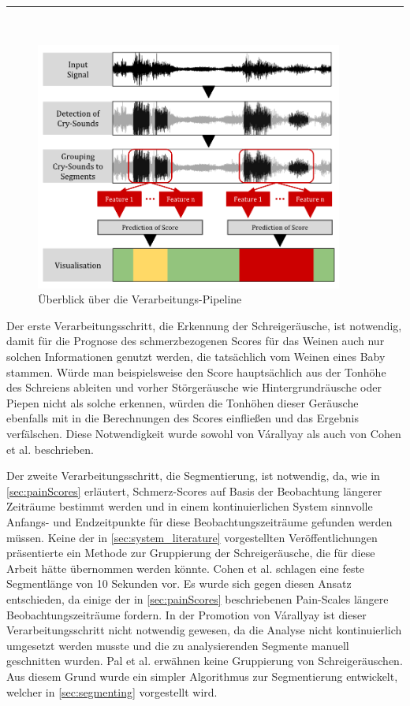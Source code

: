 \noindent\rule{\linewidth}{0.3pt} \\

\begin{figure}[h]
	\centering
	\includegraphics[width=0.9\textwidth]{bilder/konzept03.png}
	\caption{Überblick über die Verarbeitungs-Pipeline}
	\label{img:architecture-overview}
\end{figure}

Der erste Verarbeitungsschritt, die Erkennung der Schreigeräusche, ist notwendig, damit für die Prognose des schmerzbezogenen Scores für das Weinen auch nur solchen Informationen genutzt werden, die tatsächlich vom Weinen eines Baby stammen. Würde man beispielsweise den Score hauptsächlich aus der Tonhöhe des Schreiens ableiten und vorher Störgeräusche wie Hintergrundräusche oder Piepen nicht als solche erkennen, würden die Tonhöhen dieser Geräusche ebenfalls mit in die Berechnungen des Scores einfließen und das Ergebnis verfälschen. Diese Notwendigkeit wurde sowohl von Várallyay \cite{cry_thesis} als auch von Cohen et al. \cite{cohenCry} beschrieben. 

Der zweite Verarbeitungsschritt, die Segmentierung, ist notwendig, da, wie in \autoref{sec:painScores} erläutert, Schmerz-Scores auf Basis der Beobachtung längerer Zeiträume bestimmt werden und in einem kontinuierlichen System sinnvolle Anfangs- und Endzeitpunkte für diese Beobachtungszeiträume gefunden werden müssen. Keine der in \autoref{sec:system_literature} vorgestellten Veröffentlichungen präsentierte ein Methode zur Gruppierung der Schreigeräusche, die für diese Arbeit hätte übernommen werden könnte. Cohen et al. \cite{cohenCry} schlagen eine feste Segmentlänge von 10 Sekunden vor. Es wurde sich gegen diesen Ansatz entschieden, da einige der in \autoref{sec:painScores} beschriebenen Pain-Scales längere Beobachtungszeiträume fordern. In der Promotion von Várallyay \cite{cry_thesis} ist dieser Verarbeitungsschritt nicht notwendig gewesen, da die Analyse nicht kontinuierlich umgesetzt werden musste und die zu analysierenden Segmente manuell geschnitten wurden. Pal et al. \cite{palEmotion} erwähnen keine Gruppierung von Schreigeräuschen. Aus diesem Grund wurde ein simpler Algorithmus zur Segmentierung entwickelt, welcher in \autoref{sec:segmenting} vorgestellt wird.

